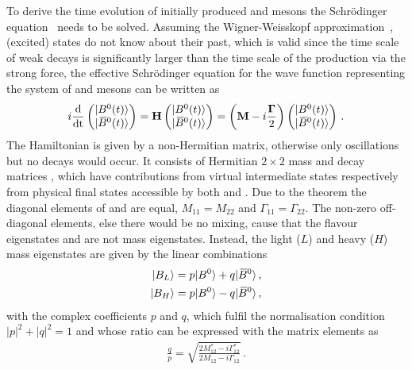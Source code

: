 To derive the time evolution of initially produced \Bd and \Bdb mesons the
Schrödinger equation~\cite{Schroedinger} needs to be solved. Assuming the
Wigner-Weisskopf approximation~\cite{Weisskopf:1930au,*Weisskopf:1930ps}, \ie
(excited) states do not know about their past, which is valid since the time
scale of weak decays is significantly larger than the time scale of the
production via the strong force, the effective Schrödinger equation for the
wave function representing the system of \Bd and \Bdb mesons can be written as
\begin{align}
	i \frac{\mathrm{d}}{\mathrm{dt}}
\begin{pmatrix}
	|{{B}^0}(t)\rangle	\\	|{{\kern 0.18em\overline{\kern -0.18em B}{}}{}^0}(t)\rangle	
\end{pmatrix}
	= \mathbf{H}
\begin{pmatrix}
	|{{B}^0}(t)\rangle	\\	|{{\kern 0.18em\overline{\kern -0.18em B}{}}{}^0}(t)\rangle	
\end{pmatrix}
	= \left(\mathbf{M} - i \frac{\mathbf{\Gamma}}{2}\right)
\begin{pmatrix}
	|{{B}^0}(t)\rangle	\\	|{{\kern 0.18em\overline{\kern -0.18em B}{}}{}^0}(t)\rangle
\end{pmatrix}
\,.
\end{align}
The Hamiltonian  is given by a non-Hermitian matrix, otherwise only
oscillations but no decays would occur. It consists of Hermitian $2\times2$
mass  and decay matrices \matr{\Gamma}, which have contributions from
virtual intermediate states respectively from physical final states accessible
by both \Bd and \Bdb. Due to the \CPT theorem the diagonal elements of
 and \matr{\Gamma} are equal, \ie $M_{11} = M_{22}$ and $\Gamma_{11} =
\Gamma_{22}$. The non-zero off-diagonal elements, else there would be no
mixing, cause that the flavour eigenstates \Bd and \Bdb are not mass
eigenstates. Instead, the light ($L$) and heavy ($H$) mass eigenstates are
given by the linear combinations
\begin{align}
\begin{split}
	|B_L\rangle = p |{{B}^0}\rangle + q |{{\kern 0.18em\overline{\kern -0.18em B}{}}{}^0}\rangle \,,\\
	|B_H\rangle = p |{{B}^0}\rangle - q |{{\kern 0.18em\overline{\kern -0.18em B}{}}{}^0}\rangle \,,
\end{split}
\label{eq:cpviolation:neutralBmesons:superposition}
\end{align}
with the complex coefficients $p$ and $q$, which fulfil the normalisation
condition $|p|^2 + |q|^2 = 1$ and whose ratio can be expressed with the matrix
elements as
\begin{align}
	\frac qp = \sqrt{\frac{2M_{12}^\ast - i\Gamma_{12}^\ast}{2M_{12} - i\Gamma_{12}}}\,.
\label{eq:cpviolation:neutralBmesons:qp}
\end{align}
